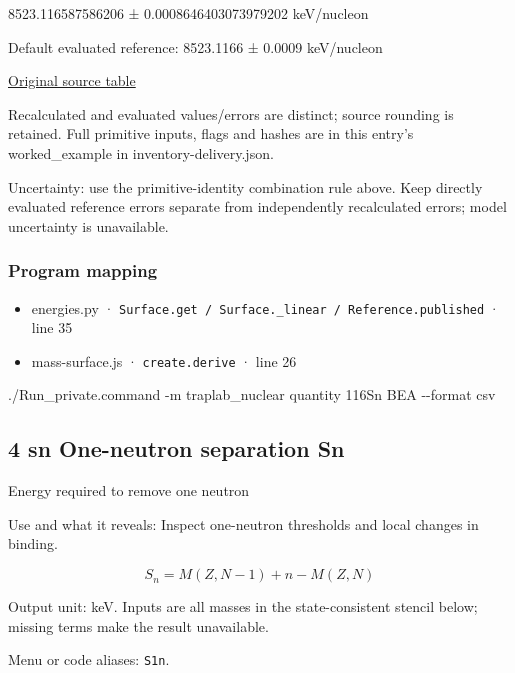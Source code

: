\documentclass[
  11pt,
  letterpaper,
]{article}
\newenvironment{Shaded}{}{}
\newcommand{\AttributeTok}[1]{\textcolor[rgb]{0.49,0.56,0.16}{#1}}
\newcommand{\ExtensionTok}[1]{#1}
\newcommand{\NormalTok}[1]{#1}
\providecommand{\tightlist}{%
  \setlength{\itemsep}{0pt}\setlength{\parskip}{0pt}}
\begin{document}
8523.116587586206 ± 0.0008646403073979202 keV/nucleon

Default evaluated reference: 8523.1166 ± 0.0009 keV/nucleon

\href{https://www-nds.iaea.org/amdc/ame2020/mass_1.mas20.txt}{Original
source table}

Recalculated and evaluated values/errors are distinct; source rounding
is retained. Full primitive inputs, flags and hashes are in this entry's
worked\_example in inventory-delivery.json.

Uncertainty: use the primitive-identity combination rule above. Keep
directly evaluated reference errors separate from independently
recalculated errors; model uncertainty is unavailable.

\subsubsection{Program mapping}\label{program-mapping-2}

\begin{itemize}
\tightlist
\item
  energies.py ·
  \texttt{Surface.get\ /\ Surface.\_linear\ /\ Reference.published} ·
  line 35
\item
  mass-surface.js · \texttt{create.derive} · line 26
\end{itemize}

\begin{Shaded}
\begin{Highlighting}[]
\ExtensionTok{./Run\_private.command} \AttributeTok{{-}m}\NormalTok{ traplab\_nuclear quantity 116Sn BEA }\AttributeTok{{-}{-}format}\NormalTok{ csv}
\end{Highlighting}
\end{Shaded}

\subsection{4 sn One-neutron separation
Sn}\label{sn-one-neutron-separation-sn}

Energy required to remove one neutron

Use and what it reveals: Inspect one-neutron thresholds and local
changes in binding.

\[
S_n=M(Z,N-1)+n-M(Z,N)
\]

Output unit: keV. Inputs are all masses in the state-consistent stencil
below; missing terms make the result unavailable.

Menu or code aliases: \texttt{S1n}.
\end{document}

